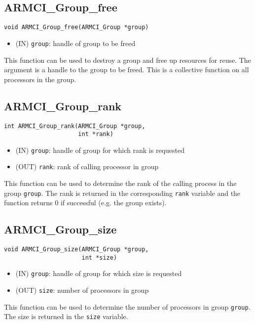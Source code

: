 \documentclass[12pt]{article}
\begin{document}
\subsection{ARMCI\_Group\_free}
\begin{verbatim}
void ARMCI_Group_free(ARMCI_Group *group)
\end{verbatim}
\begin{itemize}
\item (IN) \texttt{group}: handle of group to be freed
\end{itemize}
This function can be used to destroy a group and free up resources for reuse.
The argument is a handle to the group to be freed. This is a collective function
on all processors in the group.

\subsection{ARMCI\_Group\_rank}
\begin{verbatim}
int ARMCI_Group_rank(ARMCI_Group *group,
                     int *rank)
\end{verbatim}
\begin{itemize}
\item (IN) \texttt{group}: handle of group for which rank is requested
\item (OUT) \texttt{rank}: rank of calling processor in group
\end{itemize}
This function can be used to determine the rank of the calling process in the
group \texttt{group}. The rank is returned in the corresponding \texttt{rank}
variable and the function returns 0 if successful (e.g. the group exists).

\subsection{ARMCI\_Group\_size}
\begin{verbatim}
void ARMCI_Group_size(ARMCI_Group *group,
                      int *size)
\end{verbatim}
\begin{itemize}
\item (IN) \texttt{group}: handle of group for which size is requested
\item (OUT) \texttt{size}: number of processors in group
\end{itemize}
This function can be used to determine the number of processors in
group \texttt{group}. The size is returned in the \texttt{size} variable.
\end{document}
